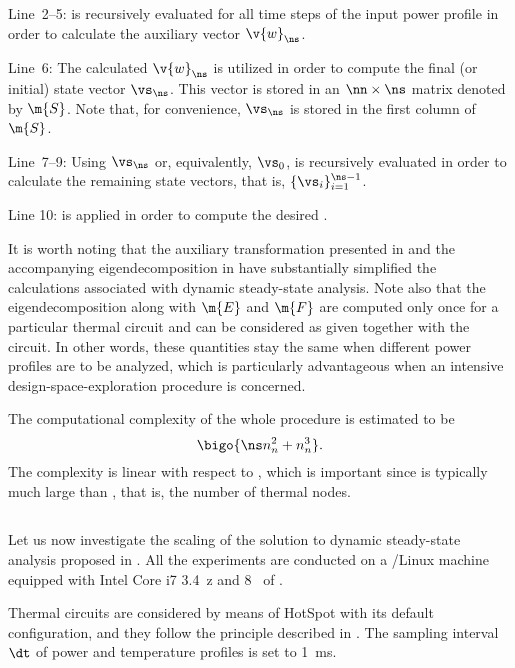 Line~2--5:  is recursively
evaluated for all time steps of the input power profile \mp in order to
calculate the auxiliary vector $\v{w}_\ns$.

Line~6: The calculated $\v{w}_\ns$ is utilized in order to compute the final (or
initial) state vector $\vs_\ns$. This vector is stored in an $\nn \times \ns$
matrix denoted by $\m{S}$. Note that, for convenience, $\vs_\ns$ is stored in
the first column of $\m{S}$.

Line~7--9: Using $\vs_\ns$ or, equivalently, $\vs_0$,
 is recursively evaluated in order to
calculate the remaining state vectors, that is, $\{ \vs_i \}_{i = 1}^{\ns - 1}$.

Line 10:  is applied in order to compute the desired
\mq.

It is worth noting that the auxiliary transformation presented in
 and the accompanying eigendecomposition in
 have substantially simplified the calculations
associated with dynamic steady-state analysis. Note also that the
eigendecomposition along with $\m{E}$ and $\m{F}$ are computed only once for a
particular thermal  circuit and can be considered as given together with
the circuit. In other words, these quantities stay the same when different power
profiles are to be analyzed, which is particularly advantageous when an
intensive design-space-exploration procedure is concerned.

The computational complexity of the whole procedure is estimated to be
\[
  \bigo{\ns n_n^2 + n_n^3}.
\]
The complexity is linear with respect to \ns, which is important since \ns is
typically much large than \nn, that is, the number of thermal nodes.

\subsection{\resultstitle}

Let us now investigate the scaling of the solution to dynamic steady-state
analysis proposed in . All the experiments
are conducted on a /Linux machine equipped with Intel Core i7
3.4~z and 8~ of .

Thermal  circuits are considered by means of HotSpot \cite{skadron2003}
with its default configuration, and they follow the principle described in
. The sampling interval $\dt$ of power and temperature
profiles is set to 1~ms.

